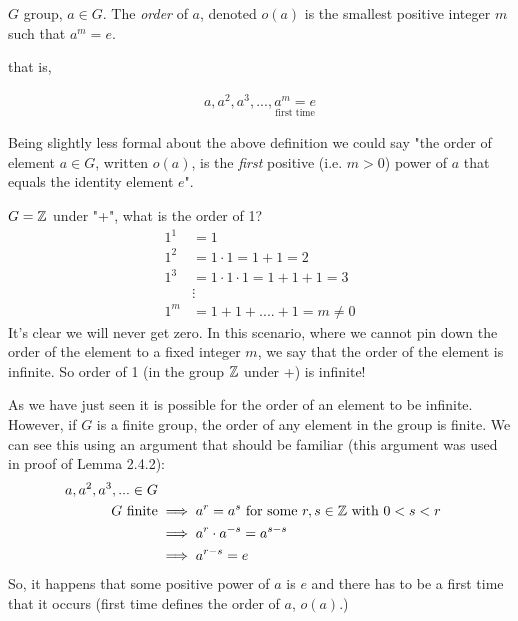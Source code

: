 \begin{definition}
$G$ group, $a\in G$. The \textit{order} of $a$, denoted $o(a)$ is the smallest positive integer $m$
such that $a^m=e$.\steezybreak

\noindent that is,

\begin{align}
    a,a^2,a^3, ..., \underset{\text{first time}}{a^m=e}\nonumber
\end{align}
\end{definition}
Being slightly less formal about the above definition we could say "the order of element $a\in G$,
written $o(a)$, is the \textit{first} positive (i.e. $m>0$) power of $a$ that equals the identity
element $e$".
\begin{example}
$G={\mathbb{Z}}$ under "+", what is the order of 1?
\begin{align}
    1^1&=1\nonumber\\
    1^2&=1\cdot 1= 1+1=2\nonumber\\
    1^3&=1\cdot 1\cdot 1=1+1+1=3\nonumber\\
    &\vdots \nonumber \\
    1^m&=1+1+....+1=m \neq 0\nonumber
\end{align}
It's clear we will never get zero. In this scenario, where we cannot pin down the order of the
element to a fixed integer $m$, we say that the order of the element is infinite. So order of 1 (in
the group ${\mathbb{Z}}$ under +) is infinite!
\end{example}
As we have just seen it is possible for the order of an element to be infinite. However, if $G$ is a
finite group, the order of any element in the group is finite. We can see this using an argument
that should be familiar (this argument was used in proof of Lemma 2.4.2):
\begin{align}
    a,a^2,a^3,... \in G \nonumber\\
    G \text{ finite} &\implies a^r=a^s \text{ for some }r,s\in {\mathbb{Z}} \text{ with }0<s<r \nonumber \\
    &\implies a^r\cdot a^{-s}=a^{s-s} \nonumber \\
    &\implies a^{r-s}=e \nonumber
\end{align}
So, it happens that some positive power of $a$ is $e$ and there has to be a first time that it
occurs (first time defines the order of $a$, $o(a)$.)
